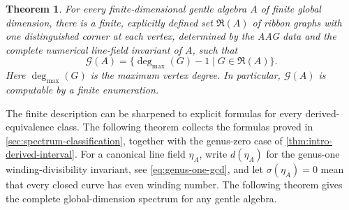 \documentclass[11pt]{amsart}
\theoremstyle{definition}
\theoremstyle{plain}
\newtheorem{theorem}{Theorem}[section]
\theoremstyle{definition}
\theoremstyle{definition}
\newcommand{\degmax}{\deg_{\max}}
\newcommand{\GSpec}{\mathcal G}
\begin{document}
\begin{theorem}
\label{thm:intro-finite-formula}
For every finite-dimensional gentle algebra $A$ of finite global dimension, there is a
finite, explicitly defined set $\mathfrak R(A)$ of ribbon graphs with one
distinguished corner at each vertex, determined by the AAG data and the
complete numerical line-field invariant of $A$, such that
\begin{equation}
\label{eq:intro-finite-formula}
 \GSpec(A)=\{\degmax(G)-1\mid G\in\mathfrak R(A)\}.
\end{equation}
Here $\degmax(G)$ is the maximum vertex degree.  In particular, $\GSpec(A)$ is
computable by a finite enumeration.
\end{theorem}


The finite description can be sharpened to explicit formulas for every
derived-equivalence class. The following theorem collects the formulas
proved in \cref{sec:spectrum-classification}, together with the genus-zero
case of \cref{thm:intro-derived-interval}.
For a canonical line field $\eta_A$, write $d(\eta_A)$ for the genus-one
winding-divisibility invariant, see \eqref{eq:genus-one-gcd}, and let $\sigma(\eta_A)=0$ mean that every
closed curve has even winding number.
The following theorem gives the complete global-dimension spectrum for any gentle algebra.
\end{document}
